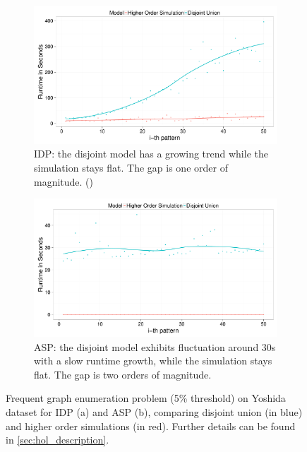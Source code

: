 \begin{figure}[thb]
\centering
\begin{subfigure}{.44\textwidth}
  \centering
\includegraphics[scale=0.14]{extra/figure_comparison_yoshida.pdf}
\caption{\footnotesize{IDP: the disjoint model has a growing trend while the simulation stays flat. The gap is one order of magnitude. (\cite{ilp_graph_mining})}}
  \label{fig:decomposition_idp}
\end{subfigure}%
\hfill
\begin{subfigure}{0.46\textwidth}
  \centering
 \includegraphics[scale=0.14]{extra/asp_fol_vs_decomposed_yoshida.pdf}
 \caption{\footnotesize{ASP: the disjoint model exhibits fluctuation around 30s with a slow runtime growth, while the simulation stays flat. The gap is two orders of magnitude.}}
  \label{fig:decomposition_asp}
\end{subfigure}
\caption{\footnotesize{Frequent graph enumeration problem (5\% threshold) on Yoshida dataset for IDP (a) and ASP (b), comparing disjoint union (in blue) and higher order simulations (in red). Further details can be found in \ref{sec:hol_description}.}}
\label{fig:decomposition_fol}
\end{figure}

